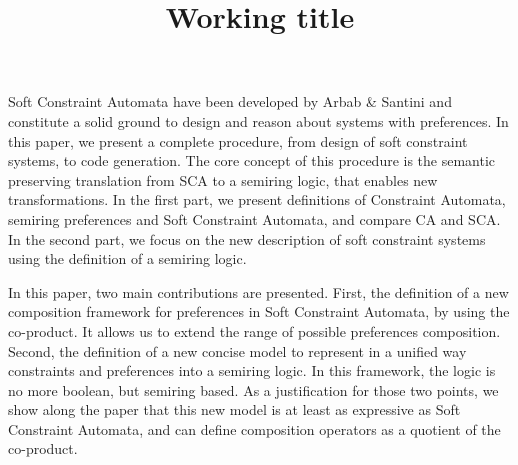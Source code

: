 \title{Working title}

\author{ }

\institute{ }

\maketitle

Soft Constraint Automata have been developed by Arbab \& Santini \cite{Arbab2013} and constitute a solid ground to design and reason about systems with preferences. In this paper, we present a complete procedure, from design of soft constraint systems, to code generation. The core concept of this procedure is the semantic preserving translation from SCA to a semiring logic, that enables new transformations. In the first part, we present definitions of Constraint Automata, semiring preferences and Soft Constraint Automata, and compare CA and SCA. In the second part, we focus on the new description of soft constraint systems using the definition of a semiring logic. 

In this paper, two main contributions are presented. First, the definition of a new composition framework for preferences in Soft Constraint Automata, by using the co-product. It allows us to extend the range of possible preferences composition. Second, the definition of a new concise model to represent in a unified way constraints and preferences into a semiring logic. In this framework, the logic is no more boolean, but semiring based. As a justification for those two points, we show along the paper that this new model is at least as expressive as Soft Constraint Automata, and can define composition operators as a quotient of the co-product.